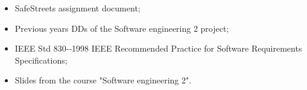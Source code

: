 \begin{itemize}
    \item SafeStreets assignment document;
    \item Previous years DDs of the Software engineering 2 project;
    \item IEEE Std 830-­‐1998 IEEE Recommended Practice	for	Software Requirements Specifications;	
    \item Slides from the course "Software engineering 2".
\end{itemize}
